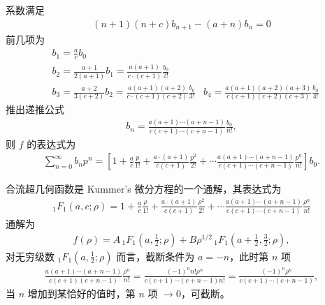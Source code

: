 系数满足
\begin{align}
    (n+1)(n+c) b_{n+1}-(a+n) b_n=0
\end{align}
前几项为
\begin{align}
    &b_1=\frac{a}{c} b_0 \\
&b_2=\frac{a+1}{2 (a+1)}  b_1=\frac{a (a+1)}{c \cdot(c+1)} \frac{b_0}{2 !} \\
&b_3=\frac{a+2}{3 (c+2)} b_2=\frac{a (a+1)(a+2)}{c \cdot(c+1)(c+2)} \frac{b_0}{3 !}
&b_4=\frac{a(a+1)(a+2)(a+3)}{c(c+1)(c+2)(c+3)} \frac{b_0}{4 !}
\end{align}
推出递推公式
\begin{align}
    b_n = \frac{a(a+1) \cdots (a+n-1)}{c(c+1)\cdots (c+n-1)} \frac{b_0}{n!},
\end{align}
则 $f$ 的表达式为
\begin{align}
    \sum_{n=0}^{\infty} b_n p^n=\left[1+\frac{a}{c} \frac{p}{1 !}+\frac{a \cdot(a+1)}{c(c+1)} \frac{p^2}{2 !}+\cdots \frac{a(a+1) \cdots(a+n-1)}{c(c+1) \cdots(c+n-1)} \frac{p^n}{n !}\right] b_0. 
\end{align}

合流超几何函数是 Kummer's 微分方程的一个通解，其表达式为
\begin{align}
    { }_1 F_1(a, c ; \rho)=1+\frac{a}{c} \frac{\rho}{1 !}+\frac{a \cdot(a+1)}{c(c+1)} \frac{\rho^2}{2 !}+\cdots \frac{a(a+1) \cdots(a+n-1)}{c(c+1) \cdots(c+n-1)} \frac{\rho^n}{n !}
\end{align}
通解为
\begin{align}
    f(\rho) = A\, {}_1F_1 \left(a,\frac12;\rho\right) + B \rho^{1/2} \, {}_1F_1 \left(a+\frac12, \frac32; \rho\right),
\end{align}
对无穷级数 ${}_1F_1\left(a,\frac12;\rho\right)$ 而言，截断条件为 $a = -n$，此时第 $n$ 项
\begin{align}
    \frac{a(a+1)\cdots(a+n-1)}{c(c+1)(c+n-1)} \frac{\rho^n}{n!} = \frac{(-1)^n n! \rho^n}{c(c+1)\cdots(c+n-1)n!} = \frac{(-1)^n \rho^n}{c(c+1)\cdots(c+n-1)},
\end{align}
当 $n$ 增加到某恰好的值时，第 $n$ 项 $\rightarrow 0$，可截断。

